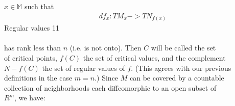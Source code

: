 \documentclass{book}
\begin{document}
  $x\in \mathbb{M}$ such that
  \begin{align*}
    df_{x} : TM_{x} -> TN_{f(x)}
  \end{align*}
  \newpage
  Regular values \hfill 11 \\ \\
  has rank less than $n$ (i.e. is not onto). Then $C$ will be called the set \\
  of critical points, $f(C)$ the set of critical values, and the complement \\
  $N - f(C)$ the set of regular values of $f$. (This agrees with our previous \\
  definitions in the case $m = n$.) Since $M$ can be covered by a countable \\
  collection of neighborhoods each diffeomorphic to an open subset of \\
  $R^m$, we have:
\end{document}
